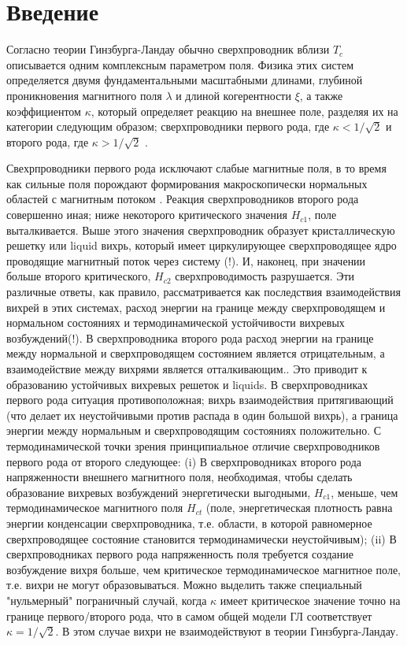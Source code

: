\chapter{Введение}
\label{ch:1}

Согласно теории Гинзбурга-Ландау обычно сверхпроводник вблизи \( T_c \) 
описывается одним комплексным параметром поля. Физика этих систем определяется 
двумя фундаментальными масштабными длинами, глубиной проникновения магнитного 
поля \( \lambda \) и длиной когерентности \( \xi \), а также коэффициентом 
\( \kappa \), который определяет реакцию на внешнее поле, разделяя их на 
категории следующим образом; сверхпроводники первого рода, где 
\( \kappa < 1/\sqrt{2} \) и второго рода, где \( \kappa > 1/\sqrt{2} \) 
\cite{bib:3}.

Свехрпроводники первого рода исключают слабые магнитные поля, в то время как 
сильные поля порождают формирования макроскопически нормальных областей с 
магнитным потоком \cite{bib:4}. Реакция сверхпроводников второго рода 
совершенно иная; ниже некоторого критического значения \( H_{c1} \), поле 
выталкивается. Выше этого значения сверхпроводник образует кристаллическую 
решетку или liquid вихрь, который имеет циркулирующее сверхпроводящее 
ядро проводящие магнитный поток через систему (!). И, наконец, при значении 
больше второго критического, \( H_{c2} \) сверхпроводимость разрушается. Эти 
различные ответы, как правило, рассматривается как последствия взаимодействия 
вихрей в этих системах, расход энергии на границе между сверхпроводящем и 
нормальном состояниях и термодинамической устойчивости вихревых возбуждений(!). 
В сверхпроводника второго рода расход энергии на границе между нормальной и 
сверхпроводящем состоянием является отрицательным, а взаимодействие между 
вихрями является отталкивающим.\cite{bib:3}. Это приводит к образованию 
устойчивых вихревых решеток и liquids. В сверхпроводниках первого рода 
ситуация противоположная; вихрь взаимодействия притягивающий (что делает их 
неустойчивыми против распада в один большой вихрь), а граница энергии между 
нормальным и сверхпроводящим состояниях положительно. С термодинамической 
точки зрения принципиальное отличие сверхпроводников первого рода от второго 
следующее: (i) В сверхпроводниках второго рода напряженности внешнего 
магнитного поля, необходимая, чтобы сделать образование вихревых возбуждений 
энергетически выгодными, \( H_{c1} \), меньше, чем термодинамическое 
магнитного поля \( H_{ct} \) (поле, энергетическая плотность равна энергии 
конденсации сверхпроводника, т.е. области, в которой равномерное 
сверхпроводящее состояние становится термодинамически неустойчивым); (ii) В 
сверхпроводниках первого рода напряженность поля требуется создание 
возбуждение вихря больше, чем критическое термодинамическое магнитное поле, 
т.е. вихри не могут образовываться. Можно выделить также специальный 
"нульмерный" пограничный случай, когда \( \kappa \) имеет критическое значение 
точно на границе первого/второго рода, что в самом общей модели ГЛ 
соответствует \( \kappa = 1/\sqrt{2} \). В этом случае вихри не 
взаимодействуют\cite{bib:5} в теории Гинзбурга-Ландау.

